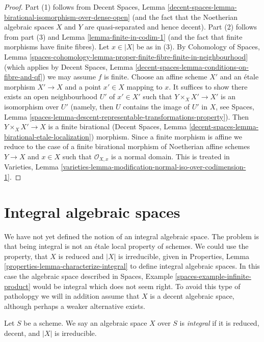 \begin{proof}
Part (1) follows from Decent Spaces, Lemma
\ref{decent-spaces-lemma-birational-isomorphism-over-dense-open}
(and the fact that the Noetherian algebraic spaces $X$ and $Y$
are quasi-separated and hence decent).
Part (2) follows from part (3) and Lemma \ref{lemma-finite-in-codim-1}
(and the fact that finite morphisms have finite fibres).
Let $x \in |X|$ be as in (3). By
Cohomology of Spaces, Lemma
\ref{spaces-cohomology-lemma-proper-finite-fibre-finite-in-neighbourhood}
(which applies by Decent Spaces, Lemma
\ref{decent-spaces-lemma-conditions-on-fibre-and-qf})
we may assume $f$ is finite. Choose an affine scheme $X'$ and
an \'etale morphism $X' \to X$ and a point $x' \in X$ mapping to $x$.
It suffices to show there exists an open neighbourhood $U'$ of $x' \in X'$
such that $Y \times_X X' \to X'$ is an isomorphism over $U'$
(namely, then $U$ contains the image of $U'$ in $X$, see Spaces, Lemma
\ref{spaces-lemma-descent-representable-transformations-property}).
Then $Y \times_X X' \to X$ is a finite birational
(Decent Spaces, Lemma \ref{decent-spaces-lemma-birational-etale-localization})
morphism. Since a finite morphism is affine we reduce to
the case of a finite birational morphism of Noetherian affine schemes
$Y \to X$ and $x \in X$ such that $\mathcal{O}_{X, x}$ is a
normal domain. This is treated in Varieties, Lemma
\ref{varieties-lemma-modification-normal-iso-over-codimension-1}.
\end{proof}






\section{Integral algebraic spaces}
\label{section-integral-spaces}

\noindent
We have not yet defined the notion of an integral algebraic space. The
problem is that being integral is not an \'etale local property of schemes.
We could use the property, that $X$ is reduced and $|X|$ is irreducible,
given in Properties, Lemma \ref{properties-lemma-characterize-integral}
to define integral algebraic spaces. In this case the algebraic
space described in Spaces, Example \ref{spaces-example-infinite-product}
would be integral which does not seem right.
To avoid this type of patholopgy we will in addition assume that $X$ is a
decent algebraic space, although perhaps a weaker alternative exists.

\begin{definition}
\label{definition-integral-algebraic-space}
Let $S$ be a scheme. We say an algebraic space $X$ over $S$ is
{\it integral} if it is reduced, decent, and $|X|$ is irreducible.
\end{definition}

